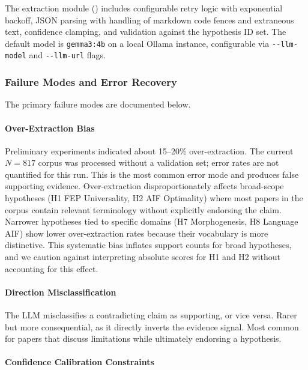 \documentclass[
  english,
]{article}
\begin{document}
The extraction module ()
includes configurable retry logic with exponential backoff, JSON parsing
with handling of markdown code fences and extraneous text, confidence
clamping, and validation against the hypothesis ID set. The default
model is \texttt{gemma3:4b} on a local Ollama instance, configurable via
\texttt{-\/-llm-model} and \texttt{-\/-llm-url} flags.

\subsubsection{Failure Modes and Error
Recovery}\label{failure-modes-and-error-recovery}

The primary failure modes are documented below.

\paragraph{Over-Extraction Bias}\label{over-extraction-bias}

Preliminary experiments indicated about 15--20\%
over-extraction. The current \(N = 817\) corpus was processed without a
validation set; error rates are not quantified for this run. This is the
most common error mode and produces false supporting evidence.
Over-extraction disproportionately affects broad-scope hypotheses (H1
FEP Universality, H2 AIF Optimality) where most papers in the corpus
contain relevant terminology without explicitly endorsing the claim.
Narrower hypotheses tied to specific domains (H7 Morphogenesis, H8
Language AIF) show lower over-extraction rates because their vocabulary
is more distinctive. This systematic bias inflates support counts for
broad hypotheses, and we caution against interpreting absolute scores
for H1 and H2 without accounting for this effect.

\paragraph{Direction
Misclassification}\label{direction-misclassification}

The LLM misclassifies a contradicting claim as supporting, or vice
versa. Rarer but more consequential, as it directly inverts the evidence
signal. Most common for papers that discuss limitations while ultimately
endorsing a hypothesis.

\paragraph{Confidence Calibration
Constraints}\label{confidence-calibration-constraints}
\end{document}
